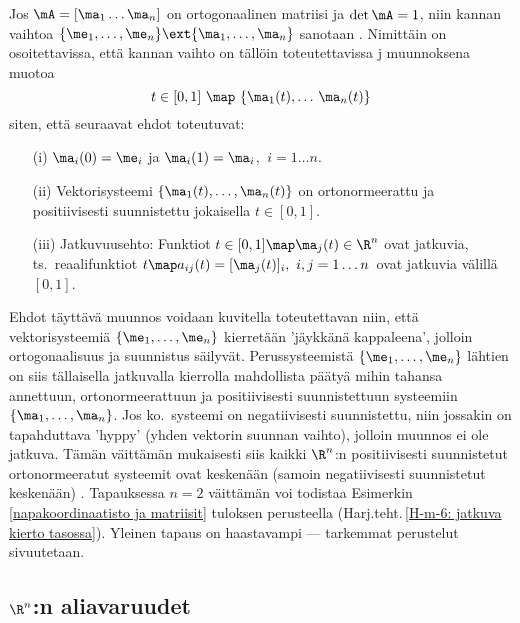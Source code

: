 Jos $\mA=[\ma_1 \ldots \ma_n]$ on ortogonaalinen matriisi ja $\det\mA=1$, niin kannan vaihtoa
$\{\me_1,\ldots,\me_n\} \ext \{\ma_1,\ldots,\ma_n\}$ sanotaan .
Nimittäin on osoitettavissa, että kannan vaihto on tällöin toteutettavissa j 
muunnoksena muotoa
\[
t\in[0,1]\ \map\ \{\ma_1(t),\ldots\,\ma_n(t)\}
\]
siten, että seuraavat ehdot toteutuvat:
\begin{itemize}
\item[(i)]   $\ma_i(0)=\me_i$ ja $\ma_i(1)=\ma_i$, $\ i=1 \ldots n$.
\item[(ii)]  Vektorisysteemi $\{\ma_1(t),\ldots,\ma_n(t)\}$ on ortonormeerattu ja positiivisesti
             suunnistettu jokaisella $t\in[0,1]$.
\item[(iii)] Jatkuvuusehto: Funktiot $t\in[0,1]\map\ma_j(t)\in\R^n$ ovat jatkuvia, ts.\
             reaalifunktiot $t \map a_{ij}(t)=[\ma_j(t)]_i,\ i,j=1 \ldots n\,$ ovat jatkuvia 
             välillä $[0,1]$. 
\end{itemize}
Ehdot täyttävä muunnos voidaan kuvitella toteutettavan niin, että vektorisysteemiä
$\{\me_1,\ldots,\me_n\}$ kierretään 'jäykkänä kappaleena', jolloin ortogonaalisuus ja suunnistus
säilyvät. Perussysteemistä $\{\me_1,\ldots,\me_n\}$ lähtien on siis tällaisella jatkuvalla 
kierrolla mahdollista päätyä mihin tahansa annettuun, ortonormeerattuun ja positiivisesti 
suunnistettuun systeemiin $\{\ma_1,\ldots,\ma_n\}$. Jos ko.\ systeemi on negatiivisesti 
suunnistettu, niin jossakin on tapahduttava 'hyppy' (yhden vektorin suunnan vaihto), jolloin 
muunnos ei ole jatkuva. Tämän väittämän mukaisesti siis kaikki $\R^n$:n positiivisesti 
suunnistetut ortonormeeratut systeemit ovat keskenään (samoin negatiivisesti suunnistetut 
\index{kiertoekvivalenssi}%
keskenään) . Tapauksessa $n=2$ väittämän voi todistaa
Esimerkin \ref{napakoordinaatisto ja matriisit} tuloksen perusteella 
(Harj.teht.\,\ref{H-m-6: jatkuva kierto tasossa}). Yleinen tapaus on haastavampi --- tarkemmat
perustelut sivuutetaan.

\subsection{$\R^n$:n aliavaruudet}

